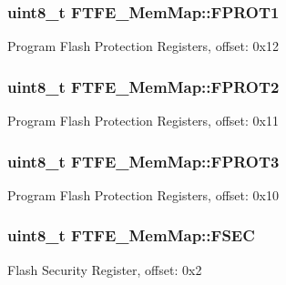 \subsubsection[{F\+P\+R\+O\+T1}]{\setlength{\rightskip}{0pt plus 5cm}uint8\+\_\+t F\+T\+F\+E\+\_\+\+Mem\+Map\+::\+F\+P\+R\+O\+T1}\label{struct_f_t_f_e___mem_map_a5a6edd9cc85f5b822067daf101cb67b3}
Program Flash Protection Registers, offset\+: 0x12 \hypertarget{struct_f_t_f_e___mem_map_ab8fe958d37448e8b4d06b1db8e3b5222}{}
\subsubsection[{F\+P\+R\+O\+T2}]{\setlength{\rightskip}{0pt plus 5cm}uint8\+\_\+t F\+T\+F\+E\+\_\+\+Mem\+Map\+::\+F\+P\+R\+O\+T2}\label{struct_f_t_f_e___mem_map_ab8fe958d37448e8b4d06b1db8e3b5222}
Program Flash Protection Registers, offset\+: 0x11 \hypertarget{struct_f_t_f_e___mem_map_a660f8b71409e54e6e4657b53e6b9fd3c}{}
\subsubsection[{F\+P\+R\+O\+T3}]{\setlength{\rightskip}{0pt plus 5cm}uint8\+\_\+t F\+T\+F\+E\+\_\+\+Mem\+Map\+::\+F\+P\+R\+O\+T3}\label{struct_f_t_f_e___mem_map_a660f8b71409e54e6e4657b53e6b9fd3c}
Program Flash Protection Registers, offset\+: 0x10 \hypertarget{struct_f_t_f_e___mem_map_a6111e18f3da7c8c12b1fdc2e584a74be}{}
\subsubsection[{F\+S\+E\+C}]{\setlength{\rightskip}{0pt plus 5cm}uint8\+\_\+t F\+T\+F\+E\+\_\+\+Mem\+Map\+::\+F\+S\+E\+C}\label{struct_f_t_f_e___mem_map_a6111e18f3da7c8c12b1fdc2e584a74be}
Flash Security Register, offset\+: 0x2 \hypertarget{struct_f_t_f_e___mem_map_a7e8a4e06df758e3dc251260d71818be8}{}
